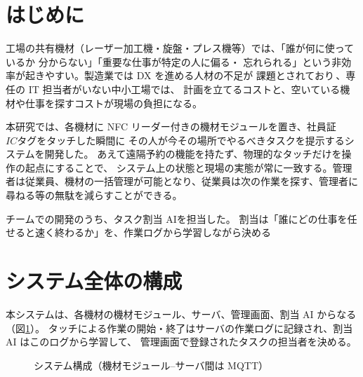\documentclass[a4paper,10pt,twocolumn,autodetect-engine,ja=standard]{bxjsarticle}
\begin{document}

\section{はじめに}
工場の共有機材（レーザー加工機・旋盤・プレス機等）では、「誰が何に使っているか
分からない」「重要な仕事が特定の人に偏る・
忘れられる」という非効率が起きやすい。製造業では DX を進める人材の不足が
課題とされており\,\cite{monozukuri,chusho}、専任の IT 担当者がいない中小工場では、
計画を立てるコストと、空いている機材や仕事を探すコストが現場の負担になる。

本研究では、各機材に NFC リーダー付きの機材モジュールを置き、社員証\(ICタグ\)をタッチした瞬間に
その人が今その場所でやるべきタスクを提示するシステムを開発した。
あえて遠隔予約の機能を持たず、物理的なタッチだけを操作の起点にすることで、
システム上の状態と現場の実態が常に一致する。管理者は従業員、機材の一括管理が可能となり、従業員は次の作業を探す、管理者に尋ねる等の無駄を減らすことができる。

チームでの開発のうち、タスク割当 AIを担当した。
割当は「誰にどの仕事を任せると速く終わるか」を、作業ログから学習しながら決める


\section{システム全体の構成}
本システムは、各機材の機材モジュール、サーバ、管理画面、割当 AI からなる（図\ref{fig:system}）。
タッチによる作業の開始・終了はサーバの作業ログに記録され、割当 AI はこのログから学習して、
管理画面で登録されたタスクの担当者を決める。
\begin{figure}[H]
  \centering
  \caption{システム構成（機材モジュール–サーバ間は MQTT）}
  \label{fig:system}
\end{figure}
\end{document}
